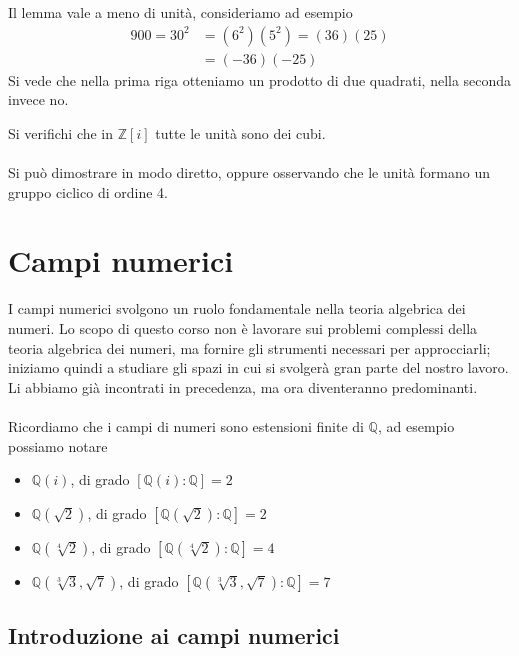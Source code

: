 \begin{osservazione}
	Il lemma vale a meno di unità, consideriamo ad esempio
	\begin{align*}
	900=30^2&=(6^2)(5^2)=(36)(25)\\
	&=(-36)(-25)
	\end{align*}
	Si vede che nella prima riga otteniamo un prodotto di due quadrati, nella seconda invece no.
\end{osservazione}
\begin{esercizio}
	Si verifichi che in $\mathbb{Z}[i]$ tutte le unità sono dei cubi. \\ \\ Si può dimostrare in modo diretto, oppure osservando che le unità formano un gruppo ciclico di ordine 4.
\end{esercizio}




\chapter{Campi numerici}
I campi numerici svolgono un ruolo fondamentale nella teoria algebrica dei numeri. Lo scopo di questo corso non è lavorare sui problemi complessi della teoria algebrica dei numeri, ma fornire gli strumenti necessari per approcciarli; iniziamo quindi a studiare gli spazi in cui si svolgerà gran parte del nostro lavoro. Li abbiamo già incontrati in precedenza, ma ora diventeranno predominanti. \\ \\
Ricordiamo che i campi di numeri sono estensioni finite di $\mathbb{Q}$, ad esempio possiamo notare
\begin{itemize}
	\item $\mathbb{Q}(i)$, di grado $[\mathbb{Q}(i):\mathbb{Q}]=2$
	\item $\mathbb{Q}(\sqrt{2})$, di grado $[\mathbb{Q}(\sqrt{2}):\mathbb{Q}]=2$
	\item $\mathbb{Q}(\sqrt[4]{2})$, di grado $[\mathbb{Q}(\sqrt[4]{2}):\mathbb{Q}]=4$
	\item $\mathbb{Q}(\sqrt[3]{3},\sqrt{7})$, di grado $[\mathbb{Q}(\sqrt[3]{3},\sqrt{7}):\mathbb{Q}]=7$
\end{itemize}




\section{Introduzione ai campi numerici}
